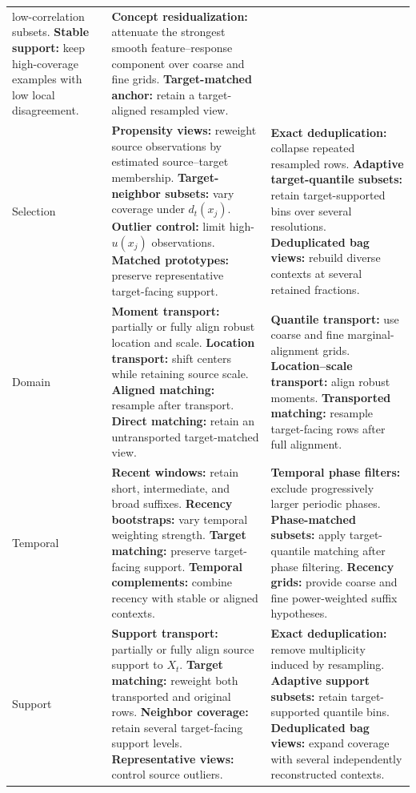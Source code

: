 \begin{longtable}{@{}>{\raggedright\arraybackslash}p{} >{\raggedright\arraybackslash}p{} >{\raggedright\arraybackslash}p{}@{}}
        low-correlation subsets. \textbf{Stable support:} keep high-coverage
        examples with low local disagreement.
      & \textbf{Concept residualization:} attenuate the strongest smooth
        feature--response component over coarse and fine grids.
        \textbf{Target-matched anchor:} retain a target-aligned resampled view. \\
    Selection
      & \textbf{Propensity views:} reweight source observations by estimated
        source--target membership. \textbf{Target-neighbor subsets:} vary
        coverage under $d_t(x_j)$. \textbf{Outlier control:} limit high-$u(x_j)$
        observations. \textbf{Matched prototypes:} preserve representative
        target-facing support.
      & \textbf{Exact deduplication:} collapse repeated resampled rows.
        \textbf{Adaptive target-quantile subsets:} retain target-supported bins
        over several resolutions. \textbf{Deduplicated bag views:} rebuild
        diverse contexts at several retained fractions. \\
    Domain
      & \textbf{Moment transport:} partially or fully align robust location and
        scale. \textbf{Location transport:} shift centers while retaining source
        scale. \textbf{Aligned matching:} resample after transport.
        \textbf{Direct matching:} retain an untransported target-matched view.
      & \textbf{Quantile transport:} use coarse and fine marginal-alignment
        grids. \textbf{Location--scale transport:} align robust moments.
        \textbf{Transported matching:} resample target-facing rows after full
        alignment. \\
    Temporal
      & \textbf{Recent windows:} retain short, intermediate, and broad suffixes.
        \textbf{Recency bootstraps:} vary temporal weighting strength.
        \textbf{Target matching:} preserve target-facing support.
        \textbf{Temporal complements:} combine recency with stable or aligned
        contexts.
      & \textbf{Temporal phase filters:} exclude progressively larger periodic
        phases. \textbf{Phase-matched subsets:} apply target-quantile matching
        after phase filtering. \textbf{Recency grids:} provide coarse and fine
        power-weighted suffix hypotheses. \\
    Support
      & \textbf{Support transport:} partially or fully align source support to
        $X_t$. \textbf{Target matching:} reweight both transported and original
        rows. \textbf{Neighbor coverage:} retain several target-facing support
        levels. \textbf{Representative views:} control source outliers.
      & \textbf{Exact deduplication:} remove multiplicity induced by resampling.
        \textbf{Adaptive support subsets:} retain target-supported quantile bins.
        \textbf{Deduplicated bag views:} expand coverage with several
        independently reconstructed contexts. \\
  \end{longtable}
\endgroup

